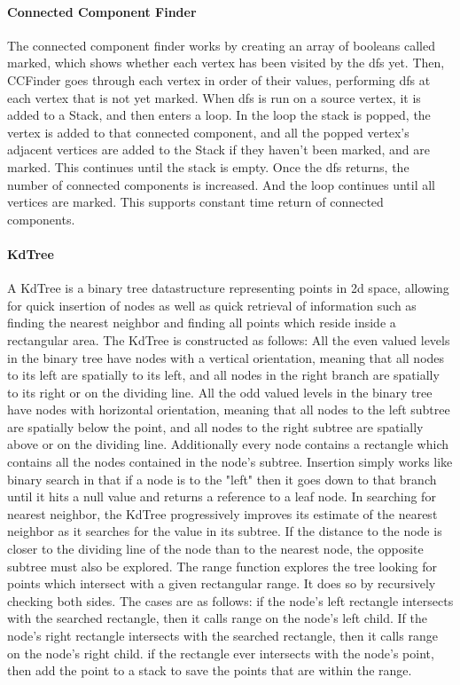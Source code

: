 \documentclass[12pt]{article}
\begin{document}
                \paragraph{Connected Component Finder} The connected component finder works by creating an array of booleans called marked, which shows whether each vertex has been visited by the dfs yet. Then, CCFinder goes through each vertex in order of their values, performing dfs at each vertex that is not yet marked. When dfs is run on a source vertex, it is added to a Stack, and then enters a loop. In the loop the stack is popped, the vertex is added to that connected component, and all the popped vertex's adjacent vertices are added to the Stack if they haven't been marked, and are marked. This continues until the stack is empty. Once the dfs returns, the number of connected components is increased. And the loop continues until all vertices are marked. This supports constant time return of connected components.
                \paragraph{KdTree} A KdTree is a binary tree datastructure representing points in 2d space, allowing for quick insertion of nodes as well as quick retrieval of information such as finding the nearest neighbor and finding all points which reside inside a rectangular area. The KdTree is constructed as follows: All the even valued levels in the binary tree have nodes with a vertical orientation, meaning that all nodes to its left are spatially to its left, and all nodes in the right branch are spatially to its right or on the dividing line. All the odd valued levels in the binary tree have nodes with horizontal orientation, meaning that all nodes to the left subtree are spatially below the point, and all nodes to the right subtree are spatially above or on the dividing line. Additionally every node contains a rectangle which contains all the nodes contained in the node's subtree. Insertion simply works like binary search in that if a node is to the "left" then it goes down to that branch until it hits a null value and returns a reference to a leaf node. In searching for nearest neighbor, the KdTree progressively improves its estimate of the nearest neighbor as it searches for the value in its subtree. If the distance to the node is closer to the dividing line of the node than to the nearest node, the opposite subtree must also be explored. The range function explores the tree looking for points which intersect with a given rectangular range. It does so by recursively checking both sides. The cases are as follows: if the node's left rectangle intersects with the searched rectangle, then it calls range on the node's left child. If the node's right rectangle intersects with the searched rectangle, then it calls range on the node's right child. if the rectangle ever intersects with the node's point, then add the point to a stack to save the points that are within the range.
\end{document}
